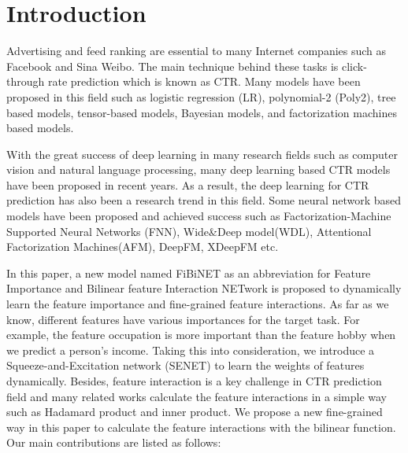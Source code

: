 \documentclass[sigconf]{acmart}
\begin{document}





\maketitle

\section{Introduction}

Advertising and feed ranking are essential to many Internet companies such as Facebook and Sina Weibo. The main technique behind these tasks is click-through rate prediction which is known as CTR. Many models
have been proposed in this field such as logistic regression (LR)\cite{mcmahan2013ad}, polynomial-2 (Poly2)\cite{juan2016field}, tree based models\cite{he2014practical}, tensor-based models\cite{koren2009matrix}, Bayesian models\cite{graepel2010web}, and factorization machines  based models\cite{rendle2010factorization,rendle2012factorization,juan2016field,juan2017field}.

With the great success of deep learning in many research fields such as
computer vision\cite{krizhevsky2012imagenet, he2016deep} and natural language processing\cite{mikolov2010recurrent, cho2014learning}, many
deep learning based CTR models have been proposed in recent
years\cite{zhang2016deep,cheng2016wide,xiao2017attentional,guo2017deepfm,lian2018xdeepfm,wang2017deep,zhou2018deep,He2017NFM}. As a result, the deep learning for CTR prediction has also been a research trend in this field. Some neural network based models have been proposed and achieved success such as Factorization-Machine Supported Neural Networks (FNN)\cite{zhang2016deep},
Wide\&Deep model(WDL)\cite{cheng2016wide}, Attentional Factorization
Machines(AFM)\cite{xiao2017attentional},  DeepFM\cite{guo2017deepfm}, XDeepFM\cite{lian2018xdeepfm} etc.

In this paper, a new model named FiBiNET as an abbreviation for Feature Importance and Bilinear feature Interaction NETwork is proposed to dynamically learn the feature importance and fine-grained feature interactions. As far as we know, different features have various importances for the target task. For example, the feature occupation is more important than the feature hobby
when we predict a person's income. Taking this into consideration, we introduce a Squeeze-and-Excitation network (SENET)\cite{hu2017squeeze} to learn the weights of features dynamically. Besides, feature interaction is a key challenge in CTR prediction field and many related works calculate the feature interactions in a simple way such as Hadamard product and inner product. We propose a new fine-grained way in this paper to calculate the feature interactions with the bilinear function.
Our main contributions are listed as follows:
\end{document}
